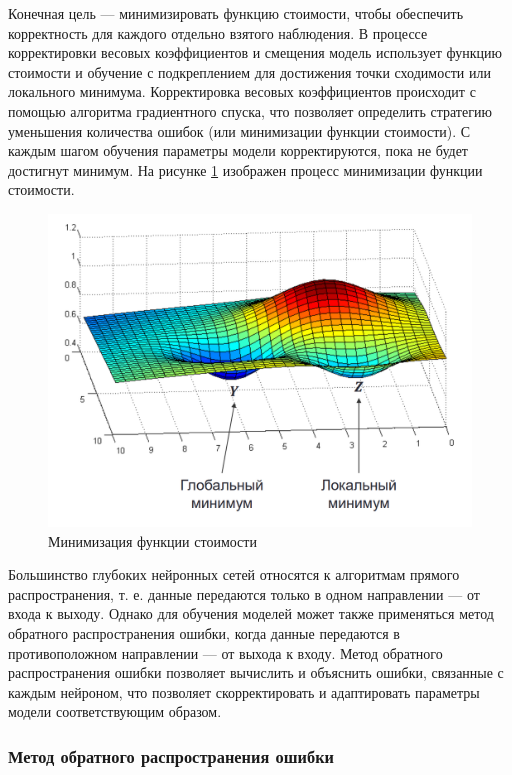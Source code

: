 Конечная цель --- минимизировать функцию стоимости, чтобы обеспечить корректность для каждого отдельно взятого наблюдения. В процессе корректировки весовых коэффициентов и смещения модель использует функцию стоимости и обучение с подкреплением для достижения точки сходимости или локального минимума. Корректировка весовых коэффициентов происходит с помощью алгоритма градиентного спуска, что позволяет определить стратегию уменьшения количества ошибок (или минимизации функции стоимости). С каждым шагом обучения параметры модели корректируются, пока не будет достигнут минимум. На рисунке \ref{fig:cost} изображен процесс минимизации функции стоимости.

\begin{figure}[H]
	\centering
	\includegraphics[width=\textwidth]{img/cost.png}
	\caption{Минимизация функции стоимости}
	\label{fig:cost}
\end{figure}

Большинство глубоких нейронных сетей относятся к алгоритмам прямого распространения, т. е. данные передаются только в одном направлении --- от входа к выходу. Однако для обучения моделей может также применяться метод обратного распространения ошибки, когда данные передаются в противоположном направлении --- от выхода к входу. Метод обратного распространения ошибки позволяет вычислить и объяснить ошибки, связанные с каждым нейроном, что позволяет скорректировать и адаптировать параметры модели соответствующим образом.

\subsubsection{Метод обратного распространения ошибки}

